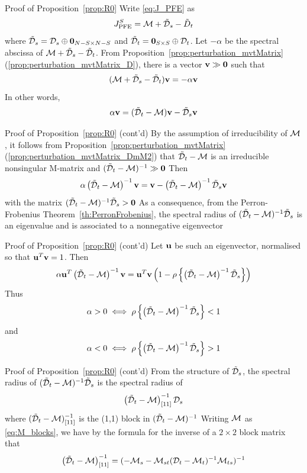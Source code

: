 \documentclass[aspectratio=169]{beamer}
\begin{document}
\begin{frame}{Proof of Proposition~\ref{prop:R0}}
		Write \eqref{eq:J_PFE} as
		\[
		J_{\textrm{PFE}}^S=\mathcal{M}+\tilde{\mathcal{D}}_s-\tilde D_t
		\]
		where $\tilde\D_s=\D_s\oplus\b0_{N-S\times N-S}$ and $\tilde \D_t=\b0_{S\times S}\oplus\D_t$.
		Let $-\alpha$ be the spectral abscissa of $\mathcal{M}+\tilde{\mathcal{D}}_s-\tilde{\mathcal{D}}_t$. 
		From Proposition~\ref{prop:perturbation_mvtMatrix}(\ref{prop:perturbation_mvtMatrix_D}), there is a vector $\bv\gg \b0$ such that
		\[
		(\mathcal{M}+\tilde{\mathcal{D}}_s-\tilde{\mathcal{D}}_t)\mathbf{v} = -\alpha\mathbf{v}
		\]
		In other words,
		\[
		\alpha\mathbf{v} = (\tilde{\mathcal{D}}_t-\mathcal{M})\mathbf{v}-\tilde{\mathcal{D}}_s\mathbf{v}
		\]
\end{frame}


\begin{frame}{Proof of Proposition~\ref{prop:R0} (cont'd)}
		By the assumption of irreducibility of $\mathcal{M}$, it follows from Proposition~\ref{prop:perturbation_mvtMatrix}(\ref{prop:perturbation_mvtMatrix_DmM2}) that $\tilde{\mathcal{D}}_t-\mathcal{M}$ is an irreducible nonsingular M-matrix and $(\tilde\D_t-\M)^{-1}\gg\b0$
		\vfill
		Then
		\[
		\alpha\left(
		\tilde{\mathcal{D}}_t-\mathcal{M}
		\right)^{-1}\mathbf{v}
		=\mathbf{v} -\left(
		\tilde{\mathcal{D}}_t-\mathcal{M}
		\right)^{-1}
		\tilde{\mathcal{D}}_s\mathbf{v}
		\]
		with the matrix $(\tilde\D_t-\M)^{-1}\tilde\D_s>\b0$
		\vfill
		As a consequence, from the Perron-Frobenius Theorem~\ref{th:PerronFrobenius}, the spectral radius of $(\tilde{\mathcal{D}}_t-\mathcal{M})^{-1}\tilde{\mathcal{D}}_s$ is an eigenvalue and is associated to a nonnegative eigenvector
\end{frame}
		
\begin{frame}{Proof of Proposition~\ref{prop:R0} (cont'd)}
		Let $\mathbf{u}$ be such an eigenvector, normalised so that $\mathbf{u}^T\mathbf{v}=1$.
		Then
		\[
		\alpha\mathbf{u}^T
		\left(\tilde{\mathcal{D}}_t-\mathcal{M}\right)^{-1}\mathbf{v} =
		\mathbf{u}^T\mathbf{v}
		\left(1-
		\rho\left\{\left(\tilde{\mathcal{D}}_t-\mathcal{M}\right)^{-1}\tilde{\mathcal{D}}_s\right\}
		\right)
		\]
		\vfill
		Thus
		\[
		\alpha>0 \iff \rho\left\{\left(\tilde{\mathcal{D}}_t-\mathcal{M}\right)^{-1}\tilde{\mathcal{D}}_s\right\} <1
		\]
		and
		\[
		\alpha<0 \iff \rho\left\{\left(\tilde{\mathcal{D}}_t-\mathcal{M}\right)^{-1}\tilde{\mathcal{D}}_s\right\} >1
		\]
\end{frame}

\begin{frame}{Proof of Proposition~\ref{prop:R0} (cont'd)}
		From the structure of $\tilde{\mathcal{D}}_s$, the spectral radius of $(\tilde{\mathcal{D}}_t-\mathcal{M})^{-1}\tilde{\mathcal{D}}_s$ is the spectral radius of 
		\[
		\left(\tilde{\mathcal{D}}_t-\mathcal{M}\right)^{-1}_{[11]}\mathcal{D}_s
		\]
		where $(\tilde{\mathcal{D}}_t-\mathcal{M})^{-1}_{[11]}$ is the (1,1) block in $(\tilde{\mathcal{D}}_t-\mathcal{M})^{-1}$
		\vfill
		Writing $\mathcal{M}$ as \eqref{eq:M_blocks}, we have by the formula for the inverse of a $2\times 2$ block matrix that 
		\[
		\left(\tilde{\mathcal{D}}_t-\mathcal{M}\right)^{-1}_{[11]}=(-\mathcal{M}_s-\mathcal{M}_{st}(\mathcal{D}_t-\mathcal{M}_t)^{-1}\mathcal{M}_{ts})^{-1}
		\]
\end{frame}
\end{document}
